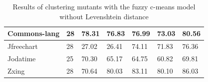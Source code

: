 \documentclass[conference,draftclsnofoot,onecolumn]{IEEEtran}
\begin{document}
\begin{table}[ht]
\begin{tabular}{|l|l|l|l|l|l|l|}
Commons-lang          & 28                                                                                               & 78.31                                                                                                                           & 76.83                                                                                                                                  & 76.99                                                                                      & 73.03                                                                                        & 80.56                                                                                       \\ \hline
Jfreechart            & 28                                                                                               & 27.02                                                                                                                           & 26.41                                                                                                                                  & 74.11                                                                                      & 71.83                                                                                        & 76.36                                                                                       \\ \hline
Jodatime              & 25                                                                                               & 70.30                                                                                                                           & 65.17                                                                                                                                  & 64.75                                                                                      & 60.82                                                                                        & 69.81                                                                                       \\ \hline
Zxing                 & 28                                                                                               & 70.64                                                                                                                           & 80.03                                                                                                                                  & 83.11                                                                                      & 80.10                                                                                        & 86.03                                                                                       \\ \hline
\end{tabular}
\caption{\label{tab:ml_no_distance}Results of clustering mutants with the fuzzy c-means model without Levenshtein distance}
\end{table}
\end{document}

